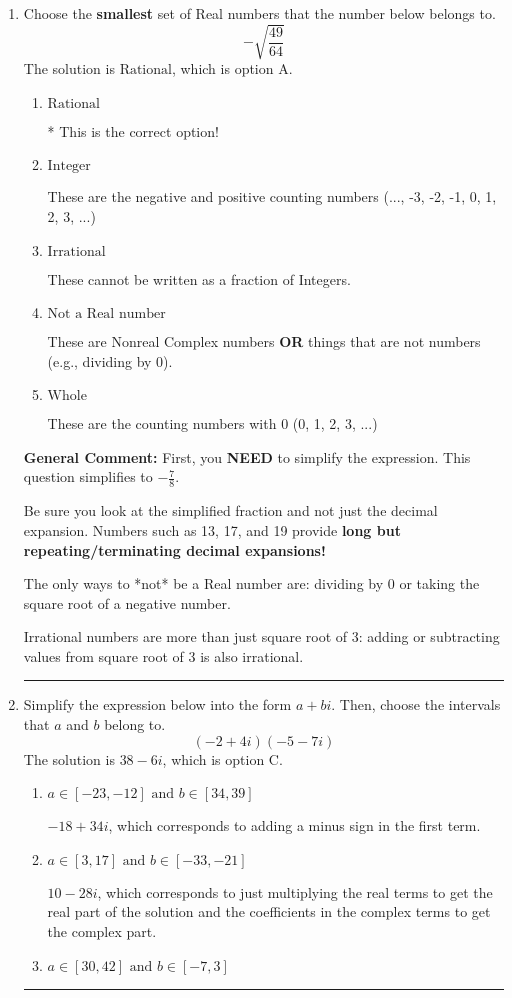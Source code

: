 \documentclass{extbook}[14pt]
\newcommand{\litem}[1]{\item #1

\rule{\textwidth}{0.4pt}}
\begin{document}
\begin{enumerate}\litem{
Choose the \textbf{smallest} set of Real numbers that the number below belongs to.
\[ -\sqrt{\frac{49}{64}} \]The solution is \( \text{Rational} \), which is option A.\begin{enumerate}[label=\Alph*.]
\item \( \text{Rational} \)

* This is the correct option!
\item \( \text{Integer} \)

These are the negative and positive counting numbers (..., -3, -2, -1, 0, 1, 2, 3, ...)
\item \( \text{Irrational} \)

These cannot be written as a fraction of Integers.
\item \( \text{Not a Real number} \)

These are Nonreal Complex numbers \textbf{OR} things that are not numbers (e.g., dividing by 0).
\item \( \text{Whole} \)

These are the counting numbers with 0 (0, 1, 2, 3, ...)
\end{enumerate}

\textbf{General Comment:} First, you \textbf{NEED} to simplify the expression. This question simplifies to $-\frac{7}{8}$. 
 
 Be sure you look at the simplified fraction and not just the decimal expansion. Numbers such as 13, 17, and 19 provide \textbf{long but repeating/terminating decimal expansions!} 
 
 The only ways to *not* be a Real number are: dividing by 0 or taking the square root of a negative number. 
 
 Irrational numbers are more than just square root of 3: adding or subtracting values from square root of 3 is also irrational.
}
\litem{
Simplify the expression below into the form $a+bi$. Then, choose the intervals that $a$ and $b$ belong to.
\[ (-2 + 4 i)(-5 - 7 i) \]The solution is \( 38 - 6 i \), which is option C.\begin{enumerate}[label=\Alph*.]
\item \( a \in [-23, -12] \text{ and } b \in [34, 39] \)

 $-18 + 34 i$, which corresponds to adding a minus sign in the first term.
\item \( a \in [3, 17] \text{ and } b \in [-33, -21] \)

 $10 - 28 i$, which corresponds to just multiplying the real terms to get the real part of the solution and the coefficients in the complex terms to get the complex part.
\item \( a \in [30, 42] \text{ and } b \in [-7, 3] \)


\end{enumerate}}
\end{enumerate}
\end{document}
